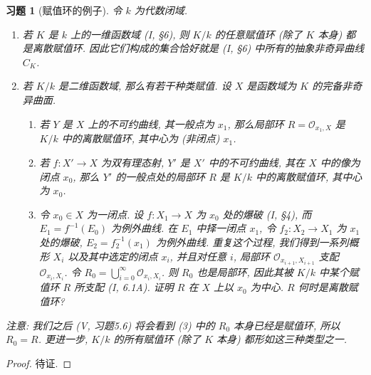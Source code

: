 \documentclass{article}
\theoremstyle{exercise}
\newtheorem{exercise}{习题}[section]
\theoremstyle{plain}
\theoremstyle{remark}
\def\sO{\mathscr{O}}
\begin{document}
\begin{exercise}[赋值环的例子]
  令 $k$ 为代数闭域.
  \begin{enumerate}[label=(\alph*)]
    \item 若 $K$ 是 $k$ 上的一维函数域 (I, \S6),
          则 $K/k$ 的任意赋值环 (除了 $K$ 本身) 都是离散赋值环.
          因此它们构成的集合恰好就是 (I, \S6) 中所有的抽象非奇异曲线 $C_K$.
    \item 若 $K/k$ 是二维函数域, 那么有若干种类赋值. 设 $X$ 是函数域为 $K$ 的完备非奇异曲面.
          \begin{enumerate}[label=(\arabic*)]
            \item 若 $Y$ 是 $X$ 上的不可约曲线, 其一般点为 $x_1$, 那么局部环 $R = \sO_{x_1, X}$ 是 $K/k$ 中的离散赋值环, 其中心为 (非闭点) $x_1$.
            \item 若 $f \colon X' \to X$ 为双有理态射, $Y'$ 是 $X'$ 中的不可约曲线, 其在 $X$ 中的像为闭点 $x_0$,
                  那么 $Y'$ 的一般点处的局部环 $R$ 是 $K/k$ 中的离散赋值环, 其中心为 $x_0$.
            \item 令 $x_0 \in X$ 为一闭点. 设 $f \colon X_1 \to X$ 为 $x_0$ 处的爆破 (I, \S4), 而 $E_1 = f^{-1}(E_0)$ 为例外曲线.
                  在 $E_1$ 中择一闭点 $x_1$, 令 $f_2 \colon X_2 \to X_1$ 为 $x_1$ 处的爆破, $E_2 = f_2^{-1}(x_1)$ 为例外曲线.
                  重复这个过程, 我们得到一系列概形 $X_i$ 以及其中选定的闭点 $x_i$, 并且对任意 $i$, 局部环 $\sO_{x_{i+1}, X_{i+1}}$ 支配 $\sO_{x_i, X_i}$.
                  令 $R_0 = \bigcup_{i = 0}^\infty \sO_{x_i, X_i}$. 则 $R_0$ 也是局部环, 因此其被 $K/k$ 中某个赋值环 $R$ 所支配 (I, 6.1A).
                  证明 $R$ 在 $X$ 上以 $x_0$ 为中心. $R$ 何时是离散赋值环?
          \end{enumerate}
  \end{enumerate}
  \textit{注意:} 我们之后 (V, 习题5.6) 将会看到 (3) 中的 $R_0$ 本身已经是赋值环, 所以 $R_0 = R$. 更进一步, $K/k$ 的所有赋值环 (除了 $K$ 本身) 都形如这三种类型之一.
\end{exercise}

\begin{proof}
  待证. \def\qedsymbol{}
\end{proof}
\end{document}
